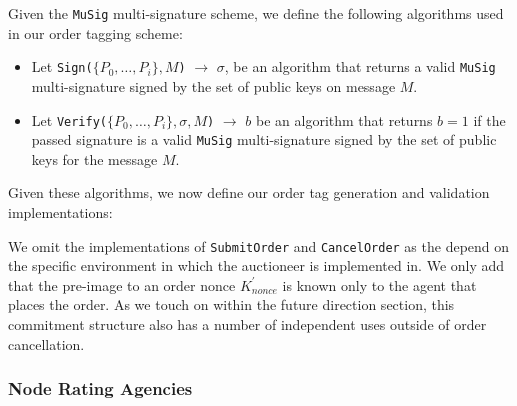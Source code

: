 \documentclass[10pt,a4paper]{article}
\theoremstyle{definition}
\begin{document}
Given the \texttt{MuSig} multi-signature scheme, we define the following
algorithms used in our order tagging scheme:
\begin{itemize}
    \item Let \texttt{Sign($\{P_{0}, \dots, P_{i}\}, M$)} $\rightarrow$
        $\sigma$, be an algorithm that returns a valid \texttt{MuSig}
        multi-signature signed by the set of public keys on message $M$.

    \item Let \texttt{Verify($\{P_{0}, \dots, P_{i}\}, \sigma, M$)}
        $\rightarrow$ $b$ be an algorithm that returns $b=1$ if the passed
        signature is a valid \texttt{MuSig} multi-signature signed by the set
        of public keys for the message $M$. 
\end{itemize}

Given these algorithms, we now define our order tag generation and validation
implementations:

\begin{pcvstack}[boxed,center, space=1em]

\end{pcvstack}

We omit the implementations of \texttt{SubmitOrder} and \texttt{CancelOrder} as
the depend on the specific environment in which the auctioneer is implemented
in. We only add that the pre-image to an order nonce $K_{nonce}^\prime$ is
known only to the agent that places the order. As we touch on within the future
direction section, this commitment structure also has a number of independent
uses outside of order cancellation.

\subsubsection{Node Rating Agencies}
\end{document}
